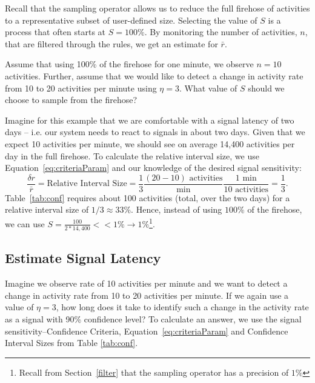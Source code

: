 \documentclass{article}
\begin{document}
Recall that the sampling operator allows us to reduce the full firehose of activities to a representative 
subset of user-defined size. Selecting the value of $S$ is a process that often starts at $S =100\%$.  
By monitoring the number of activities, $n$, that are filtered through the rules, we get an 
estimate for $\bar{r}$.

Assume that using 100\% of the firehose for one minute, we observe $n = 10$ activities. Further, assume 
that we would like to detect a change in activity rate from 10 to 20 activities per minute using 
$\eta = 3$. What value of $S$ should we choose to sample from the firehose?

Imagine for this example that we are comfortable with a signal latency of two days -- i.e. our system 
needs to react to signals in about two days. Given that we expect 10 activities per minute, we should 
see on average 14,400 activities per day in the full firehose. To calculate the relative interval size, we
use Equation~\ref{eq:criteriaParam} and our knowledge of the desired signal sensitivity:
\begin{equation}
\label{eq:ex1:criteria}
\frac{\delta r}{\bar{r}} = \text{Relative Interval Size} = 
	\frac{1}{3} 
	\frac{(20-10) \text{ activities}}{\text{min}} 
	\frac{1 \text{ min}}{10 \text{ activities}} = \frac{1}{3}.
\end{equation}
Table~\ref{tab:conf} requires about 100 activities (total, over the two days) 
for a relative interval size of $1/3 \approx 33\%$. Hence, instead of using $100\%$ of the 
firehose, we can use $S = \frac{100}{2*14,400} << 1\% \rightarrow 1\%$\footnote{Recall from 
Section~\ref{filter} that the sampling operator has a precision of $1\%$}.



   
\subsection{Estimate Signal Latency} 
\label{ex:2}


Imagine we observe rate of 10 activities per minute and we want to detect a change in activity 
rate from 10  to 20 activities per minute.  If we again use a value of $\eta = 3$, how long 
does it take to identify such a change in 
the activity rate as a signal with 90\% confidence level? To calculate an answer, we use the 
signal sensitivity--Confidence Criteria, Equation~\ref{eq:criteriaParam} and Confidence Interval 
Sizes from Table \ref{tab:conf}.
\end{document}
